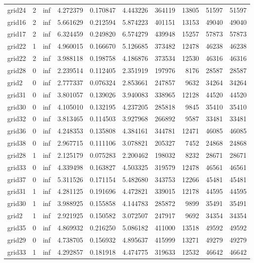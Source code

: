 \begin{longtable}{|l|r|r|r|r|r|r|r|r|r|}
grid24 & 2 & inf & 4.272379 & 0.170847 & 4.443226 & 364119 & 13805 & 51597 & 51597 \\
grid16 & 2 & inf & 5.661629 & 0.212594 & 5.874223 & 401151 & 13153 & 49040 & 49040 \\
grid17 & 2 & inf & 6.324459 & 0.249820 & 6.574279 & 439948 & 15257 & 57873 & 57873 \\
grid22 & 1 & inf & 4.960015 & 0.166670 & 5.126685 & 373482 & 12478 & 46238 & 46238 \\
grid22 & 2 & inf & 3.988118 & 0.198758 & 4.186876 & 373534 & 12530 & 46316 & 46316 \\
grid28 & 0 & inf & 2.239514 & 0.112405 & 2.351919 & 197976 & 8176 & 28587 & 28587 \\
grid2 & 0 & inf & 2.777337 & 0.076324 & 2.853661 & 247857 & 9632 & 34264 & 34264 \\
grid31 & 0 & inf & 3.801057 & 0.139026 & 3.940083 & 338965 & 12128 & 44520 & 44520 \\
grid30 & 0 & inf & 4.105010 & 0.132195 & 4.237205 & 285818 & 9845 & 35410 & 35410 \\
grid32 & 0 & inf & 3.813465 & 0.114503 & 3.927968 & 266892 & 9587 & 33481 & 33481 \\
grid36 & 0 & inf & 4.248353 & 0.135808 & 4.384161 & 344781 & 12471 & 46085 & 46085 \\
grid38 & 0 & inf & 2.967715 & 0.111106 & 3.078821 & 205327 & 7452 & 24868 & 24868 \\
grid28 & 1 & inf & 2.125179 & 0.075283 & 2.200462 & 198032 & 8232 & 28671 & 28671 \\
grid33 & 0 & inf & 4.339498 & 0.163827 & 4.503325 & 319579 & 12478 & 46561 & 46561 \\
grid37 & 0 & inf & 5.311526 & 0.171154 & 5.482680 & 343753 & 12266 & 45481 & 45481 \\
grid31 & 1 & inf & 4.281125 & 0.191696 & 4.472821 & 339015 & 12178 & 44595 & 44595 \\
grid30 & 1 & inf & 3.988925 & 0.155858 & 4.144783 & 285872 & 9899 & 35491 & 35491 \\
grid2 & 1 & inf & 2.921925 & 0.150582 & 3.072507 & 247917 & 9692 & 34354 & 34354 \\
grid35 & 0 & inf & 4.869932 & 0.216250 & 5.086182 & 411000 & 13518 & 49592 & 49592 \\
grid29 & 0 & inf & 4.738705 & 0.156932 & 4.895637 & 415999 & 13271 & 49279 & 49279 \\
grid33 & 1 & inf & 4.292857 & 0.181918 & 4.474775 & 319633 & 12532 & 46642 & 46642 \\

\end{longtable}
